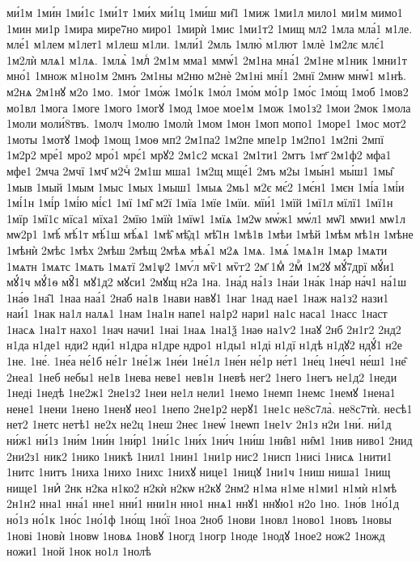 {ми́1м
1ми́н
1ми́1с
1ми́1т
1ми́х
ми́1ц
1ми́ш
ми̑1
1миж
1ми1л
мило1
ми1м
мимо1
1мин
ми1р
1мира
мире7но
миро1
1мирѝ
1мис
1ми1т2
1мищ
мл2
1мла
мла́1
м1ле.
мле́1
м1лем
м1лет1
м1леш
м1ли.
1мли́1
2мль
1млю̀
м1лют
1млѐ
1м2лє
млє́1
1м2лѝ
млѧ1
м1лѧ.
1млѧ̀
1млⷭ
2м1м
мма1
ммѡ́1
2м1на
мна́1
2м1не
м1ник
1мни1т
мно́1
1множ
м1но1м
2мнъ
2м1ны
м2ню
м2нѐ
2м1ні
мні́1
2мнї
2мнѡ
мнѡ́1
м1нѣ.
м2нѧ
2м1нꙋ
м2о
1мо.
1мо́г
1мо́ж
1мо́1к
1мо́л
1мо́м
мо́1р
1мо́с
1мо́щ
1моб
1мов2
мо1вл
1мога
1моге
1мого
1могꙋ
1мод
1мое
мое1м
1мож
1мо1з2
1мои
2мок
1мола
1моли
моли́8твъ.
1молч
1молю
1молѝ
1мом
1мон
1моп
мопо1
1море1
1мос
мот2
1моты
1мотꙋ
1моф
1мощ
1моѳ
мп2
2м1па2
1м2пе
мпе1р
1м2по1
1м2пі
2мпї
1м2р2
мре́1
мро2
мро́1
мрє́1
мрꙋ2
2м1с2
мска1
2м1ти1
2мтъ
1мт҃
2м1ф2
мфа1
мфе1
2мча
2мчї
1мч҃
м2чⷭ
2м1ш
мша1
1м2щ
мще́1
2мъ
м2ы
1мы́н1
мы́ш1
1мы̑
1мыв
1мый
1мым
1мыс
1мых
1мыш1
1мыѧ
2мь1
м2є
мє́2
1мє́н1
1мєн
1мі́а
1мі́и
1мі́1н
1мі́р
1мі́ю
мі́є1
1мї
1мі̑
м2ї
1мїа
1мїе
1мїи.
мїи́1
1мїй
1мї1л
мїлї1
1мї1н
1мїр
1мї1с
мїса1
мїха1
2мїю
1мїѝ
1мїѡ1
1мїѧ
1м2ѡ
мѡ́ж1
мѡ́л1
мѡ̑1
мѡи1
мѡ1л
мѡ2р1
1мѣ́
мѣ́1т
мѣ́1ш
мѣ́ѧ1
1мѣ̑
мѣ̑д1
мѣ̑1н
1мѣ1в
1мѣи
1мѣй
1мѣм
мѣ1н
1мѣне
1мѣнѝ
2мѣс
1мѣх
2мѣш
2мѣщ
2мѣѧ
мѣѧ́1
м2ѧ
1мѧ.
1мѧ́
1мѧ1н
1мѧр
1мѧти
1мѧтн
1мѧтс
1мѧть
1мѧтї
2м1ѱ2
1мѵ́л
мѷ1
мѷг2
2м҃
1мⷣ
2мⷬ
1м2ꙋ
мꙋ́7дрї
мꙋ́и1
мꙋ́1ч
мꙋ́1ѳ
мꙋ̑1
мꙋ1д2
мꙋси1
2мꙋщ
н2а
1на.
1на́д
на́1з
1на́и
1на́к
1на́р
на́ч1
на́1ш
1на́ѳ
1на̑1
1наа
наа́1
2наб
на1в
1нави
навꙋ1
1наг
1над
нае1
1наж
на1з2
нази1
наи́1
1нак
на1л
налѧ1
1нам
1на1н
напе1
на1р2
нари1
на1с
наса1
1насс
1наст
1насѧ
1на1т
нахо1
1нач
начи1
1наі
1наѧ
1на1ѯ
1наѳ
на1ѵ2
1наꙋ
2нб
2н1г2
2нд2
н1да
н1де1
нди2
нди́1
н1дра
н1дре
ндро1
н1ды1
н1ді
н1дї
н1дѣ
н1дꙋ2
ндꙋ́1
н2е
1не.
1не́.
1не́а
не́1б
не́1г
1не́1ж
1не́и
1не́1л
1не́н
не́1р
не́т1
1не́ц
1не́ч1
не́ш1
1не̑
2неа1
1неб
небы1
не1в
1нева
неве1
нев1н
1невѣ
нег2
1него
1негъ
не1д2
1неди
1неді
1недѣ
1не2ж1
2не1з2
1неи
не1л
нели1
1немо
1немп
1немс
1немꙋ
1нена1
нене1
1нени
1нено
1ненꙋ
нео1
1непо
2не1р2
нерꙋ1
1не1с
не8с7ла̀.
не8с7тѝ.
несѣ1
нет2
1нетс
нетѣ1
не2х
не2ц
1неш
2неє
1неѡ́
1неѡп
1не1ѵ
2н1з
н2и
1ни́.
ни́1д
ни́ж1
ни́1з
1ни́м
1ни́н
1ни́р1
1ни́1с
1ни́х
1ни́ч
1ни́ш
1ни̑в1
ни̑м1
1нив
ниво1
2нид
2ни2з1
ник2
1нико
1никѣ
1нил1
1нин1
1ни1р
нис2
1нисп
1нисі
1нисѧ
1нити1
1нитс
1нитъ
1ниха
1нихо
1нихс
1нихꙋ
нице1
1ницꙋ
1ни1ч
1ниш
ниша1
1нищ
нище1
1ниⷯ
2нк
н2ка
н1ко2
н2кѝ
н2кѡ
н2кꙋ
2нм2
н1ма
н1ме
н1ми1
н1мѝ
н1мѣ
2н1н2
нна1
нна́1
нне1
нни́1
нни1н
нно1
ннѧ1
ннꙋ1
ннꙋю1
н2о
1но.
1но́в
1но́1д
но́1з
но́1к
1но́с
1но́1ф
1но́щ
1но́ї
1ноа
2ноб
1нови
1новл
1ново1
1новъ
1новы
1нові
1новѝ
1новѡ
1новѧ
1новꙋ
1ногд
1ногр
1ноде
1нодꙋ
1ное2
нож2
1ножд
ножи1
1ной
1нок
но1л
1нолѣ
}
